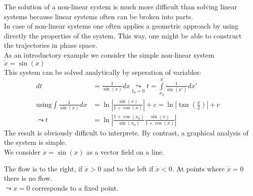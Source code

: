 The solution of a non-linear system is much more difficult than solving linear systems because linear systems often can be broken into parts.\\
In case of non-linear systems one often applies a geometric approach by using directly the properties of the system. This way, one might be able to construct the trajectories in phase space. 
\textbf{\underline{}}\vspace{0.2 cm}\\
As an introductory example we consider the simple non-linear system $\dot{x}=\sin(x)$\\
This system can be solved analytically by seperation of variables:
\begin{align*}
	dt&=\frac{1}{\sin(x)}dx \underset{t_0=0}{\leadsto} t=\int\limits_{x_0}^{x}\frac{1}{\sin(x')}dx'\\
	\text{using} \int\frac{1}{\sin(x)}dx&=\ln\left|\frac{\sin(x)}{1+\cos(x)}\right|+c=\ln\left|\tan\left(\frac{x}{2}\right)\right|+c\\
	\leadsto t&=\ln\left|\frac{1+\cos(x_0)}{\sin(x_0)}\frac{\sin(x)}{1+\cos(x)}\right|
\end{align*}
The result is obviously difficult to interprete. By contrast, a graphical analysis of the system is simple.\\
We consider $\dot{x}=\sin(x)$ as a vector field on a line.
\begin{figure}[H]
\end{figure}
\noindent The flow is to the right, if $\dot{x}>0$ and to the left if $\dot{x}<0$. At points where $\dot{x}=0$ there is no flow.\\
$\leadsto \dot{x}=0$ corresponds to a fixed point.\\
\begin{figure}[H]
\end{figure}
